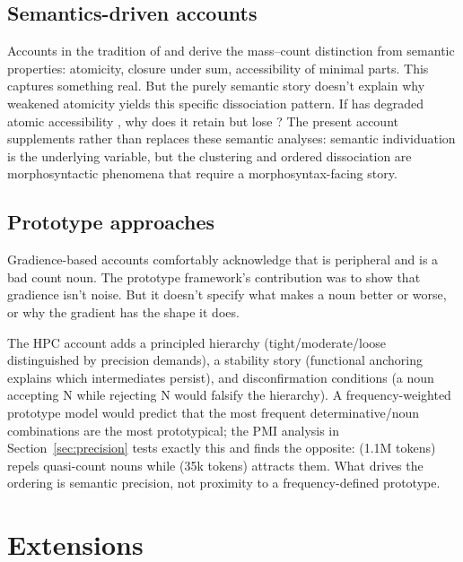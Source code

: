 \documentclass[12pt,a4paper]{article}
\begin{document}
\subsection{Semantics-driven accounts}

Accounts in the tradition of \textcite{chierchia1998} and \textcite{rothstein2010} derive the mass--count distinction from semantic properties: atomicity, closure under sum, accessibility of minimal parts. This captures something real. But the purely semantic story doesn't explain why weakened atomicity yields this specific dissociation pattern. If  has degraded atomic accessibility \citep{grimm2018}, why does it retain  but lose ? The present account supplements rather than replaces these semantic analyses: semantic individuation is the underlying variable, but the clustering and ordered dissociation are morphosyntactic phenomena that require a morphosyntax-facing story.

\subsection{Prototype approaches}

Gradience-based accounts \citep{taylor2003} comfortably acknowledge that  is peripheral and  is a bad count noun. The prototype framework's contribution was to show that gradience isn't noise. But it doesn't specify what makes a noun better or worse, or why the gradient has the shape it does.

The HPC account adds a principled hierarchy (tight/moderate/loose distinguished by precision demands), a stability story (functional anchoring explains which intermediates persist), and disconfirmation conditions (a noun accepting  N while rejecting  N would falsify the hierarchy). A frequency-weighted prototype model would predict that the most frequent determinative/noun combinations are the most prototypical; the PMI analysis in Section~\ref{sec:precision} tests exactly this and finds the opposite:  (1.1M tokens) repels quasi-count nouns while  (35k tokens) attracts them. What drives the ordering is semantic precision, not proximity to a frequency-defined prototype.

\section{Extensions}\label{sec:extensions}
\end{document}
